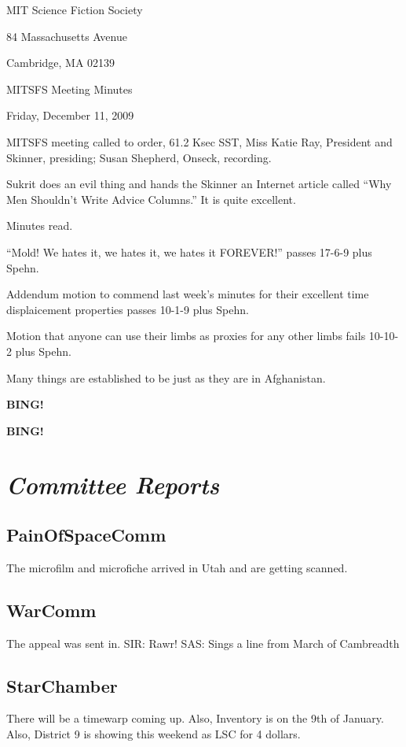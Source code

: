 \documentclass[10pt]{article}
\newcommand{\bing}{{\bf BING!} }
\newcommand{\goto}[1]{\bing \vskip 12pt \section*{{\em{#1}}}}
\newcommand{\ps}{ plus Spehn\xspace}
\newcommand{\skinner}{Miss Katie Ray, President and Skinner}
\newcommand{\onseck}{Susan Shepherd, Onseck}
\newcommand{\meetingdate}{Friday, December 11, 2009}
\begin{document}
\begin{center}

MIT Science Fiction Society

84 Massachusetts Avenue

Cambridge, MA 02139

\vspace{12pt}

MITSFS Meeting Minutes

\meetingdate

\end{center}

\vspace{18pt}

\setlength{\parskip}{6pt}

\noindent
MITSFS meeting called to order, 61.2 Ksec SST,
\skinner, presiding; \onseck, recording.

Sukrit does an evil thing and hands the Skinner an Internet article called ``Why Men Shouldn't Write Advice Columns.'' It is quite excellent.

Minutes read.

``Mold! We hates it, we hates it, we hates it FOREVER!'' passes 17-6-9\ps.

Addendum motion to commend last week's minutes for their excellent time displaicement properties passes 10-1-9\ps.

Motion that anyone can use their limbs as proxies for any other limbs fails 10-10-2\ps.

Many things are established to be just as they are in Afghanistan.

\bing

\goto{Committee Reports}

\subsection*{PainOfSpaceComm}
The microfilm and microfiche arrived in Utah and are getting scanned.

\subsection*{WarComm}
The appeal was sent in. SIR: Rawr! SAS: Sings a line from March of Cambreadth

\subsection*{StarChamber}
There will be a timewarp coming up. Also, Inventory is on the 9th of January. Also, District 9 is showing this weekend as LSC for 4 dollars.
\end{document}

